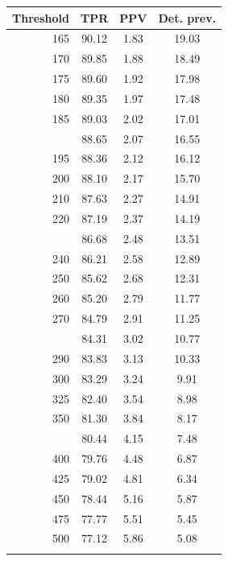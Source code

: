 \documentclass[12pt]{article}
\begin{document}
\begin{minipage}{0.5\textwidth}\small
\begin{tabular}{rccc}
\toprule
\textbf{Threshold} & \textbf{TPR} 
& \textbf{PPV} & \textbf{Det. prev.} \\
\midrule
  165 & 90.12 & 1.83 & 19.03 \\ 
  170 & 89.85 & 1.88 & 18.49 \\ 
  175 & 89.60 & 1.92 & 17.98 \\ 
  180 & 89.35 & 1.97 & 17.48 \\ 
  185 & 89.03 & 2.02 & 17.01 \\  \addlinespace
  190 & 88.65 & 2.07 & 16.55 \\ 
  195 & 88.36 & 2.12 & 16.12 \\ 
  200 & 88.10 & 2.17 & 15.70 \\ 
  210 & 87.63 & 2.27 & 14.91 \\ 
  220 & 87.19 & 2.37 & 14.19 \\  \addlinespace
  230 & 86.68 & 2.48 & 13.51 \\ 
  240 & 86.21 & 2.58 & 12.89 \\ 
  250 & 85.62 & 2.68 & 12.31 \\ 
  260 & 85.20 & 2.79 & 11.77 \\ 
  270 & 84.79 & 2.91 & 11.25 \\  \addlinespace
  280 & 84.31 & 3.02 & 10.77 \\ 
  290 & 83.83 & 3.13 & 10.33 \\ 
  300 & 83.29 & 3.24 & 9.91 \\ 
  325 & 82.40 & 3.54 & 8.98 \\ 
  350 & 81.30 & 3.84 & 8.17 \\  \addlinespace
  375 & 80.44 & 4.15 & 7.48 \\ 
  400 & 79.76 & 4.48 & 6.87 \\ 
  425 & 79.02 & 4.81 & 6.34 \\ 
  450 & 78.44 & 5.16 & 5.87 \\ 
  475 & 77.77 & 5.51 & 5.45 \\
  500 & 77.12 & 5.86 & 5.08 \\ 
  \addlinespace\addlinespace\addlinespace  \addlinespace
\bottomrule
\end{tabular}

\end{minipage}
\end{document}
